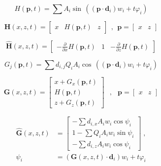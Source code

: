 \begin{equation} \label{eq:sum_of_sine_waves}
    H(\mathbf{p},t) = \sum{
        A_i \sin \, (
            (\mathbf{p} \cdot \mathbf{d}_i) w_i
            + t \varphi_i
        )
    }
\end{equation}

\begin{equation} \label{eq:sum_of_sine_waves_position}
    \mathbf{H}(x,z,t) = \begin{bmatrix}
        x&
        H(\mathbf{p},t)&
        z
    \end{bmatrix}\;\,,\;\,
    \mathbf{p} = \begin{bmatrix}
        x&z
    \end{bmatrix}
\end{equation}

\begin{equation} \label{eq:sum_of_sine_waves_normal}
    \mathbf{\hat{H}}(x,z,t) = \begin{bmatrix}
        -\frac{\partial}{\partial x} H(\mathbf{p},t)&
        1&
        -\frac{\partial}{\partial z} H(\mathbf{p},t)
    \end{bmatrix}
\end{equation}

\begin{equation} \label{eq:gerstner_wave}
    G_j(\mathbf{p},t) = \sum{
        d_{i,j} Q_iA_i \cos \, (
            (\mathbf{p} \cdot \mathbf{d}_i) w_i
            + t \varphi_i
        )
    }
\end{equation}

\begin{equation} \label{eq:gerstner_wave_position}
    \mathbf{G}(x,z,t) = \begin{bmatrix}
        x + G_x(\mathbf{p},t)\\
        H(\mathbf{p},t)\\
        z + G_z(\mathbf{p},t)
    \end{bmatrix}\;\;\,,\;\;\,
    \mathbf{p} = \begin{bmatrix}
        x&z
    \end{bmatrix}
\end{equation}

\begin{equation} \label{eq:gerstner_wave_normal}
    \begin{split}
    \mathbf{\hat{G}}(x,z,t) &= \begin{bmatrix}
        -\sum{d_{i,x} A_iw_i \cos \psi_i}\\
        1 - \sum{Q_iA_iw_i \sin \psi_i}\\
        -\sum{d_{i,z} A_iw_i \cos \psi_i}
    \end{bmatrix}\;,\\
        \psi_i &= (\mathbf{G}(x,z,t) \cdot \mathbf{d}_i)w_i + t \varphi_i
    \end{split}
\end{equation}
